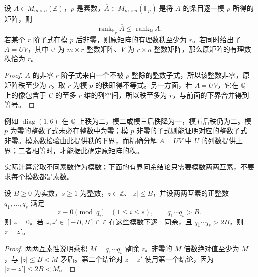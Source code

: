 \begin{proposition}\label{b2:prop:A-modular-rank}
	设 \(A\in M_{m\times n}(\mathbb Z)\)，\(p\) 是素数，\(\overline A\in M_{m\times n}(\mathbb F_p)\) 是将 \(A\) 的条目逐一模 \(p\) 所得的矩阵，则
	\[
		\operatorname{rank}_{\mathbb F_p}\overline A\le \operatorname{rank}_{\mathbb Q}A.
	\]
	若某个 \(r\) 阶子式在模 \(p\) 后非零，则原矩阵的有理数秩至少为 \(r\)。若同时给出了 \(A=UV\)，其中 \(U\) 为 \(m\times r\) 整数矩阵、\(V\) 为 \(r\times n\) 整数矩阵，那么原矩阵的有理数秩恰为 \(r\)。
\end{proposition}
\begin{proof}
	\(\overline A\) 的非零 \(r\) 阶子式来自一个不被 \(p\) 整除的整数子式，所以该整数非零，原矩阵秩至少为 \(r\)。取 \(r\) 为模 \(p\) 的秩即得不等式。另一方面，若 \(A=UV\)，它在 \(\mathbb Q\) 上的像包含于 \(U\) 的至多 \(r\) 维的列空间，所以秩至多为 \(r\)，与前面的下界合并得到等号。
\end{proof}

例如 \(\operatorname{diag}(1,6)\) 在 \(\mathbb Q\) 上秩为二，模二或模三后秩降为一，模五后秩仍为二。模 \(p\) 为零的整数子式未必在整数中为零；模 \(p\) 非零的子式则能证明对应的整数子式非零。模素数检验由此提供秩的下界，而精确分解 \(A=UV\) 中 \(U\) 的列数提供上界；二者相等时，才能据此确定原矩阵的秩。

\ProseParagraphBreak
实际计算常取不同素数作为模数；下面的有界同余结论只需要模数两两互素，不要求每个模数都是素数。

\begin{proposition}\label{b2:prop:A-bounded-congruence}
	设 \(B\ge0\) 为实数，\(s\ge1\) 为整数，\(z\in\mathbb Z\)、\(|z|\le B\)，并设两两互素的正整数 \(q_1,\ldots,q_s\) 满足
	\[
		z\equiv0\pmod {q_i}\quad(1\le i\le s),\qquad q_1\cdots q_s>B.
	\]
	则 \(z=0\)。若 \(z,z'\in[-B,B]\cap\mathbb Z\) 在这些模数下逐一同余，且 \(q_1\cdots q_s>2B\)，则 \(z=z'\)。
\end{proposition}
\begin{proof}
	两两互素性说明乘积 \(M=q_1\cdots q_s\) 整除 \(z\)。非零的 \(M\) 倍数绝对值至少为 \(M\)，与 \(|z|\le B<M\) 矛盾。第二个结论对 \(z-z'\) 使用第一个结论，因为 \(|z-z'|\le2B<M\)。
\end{proof}

